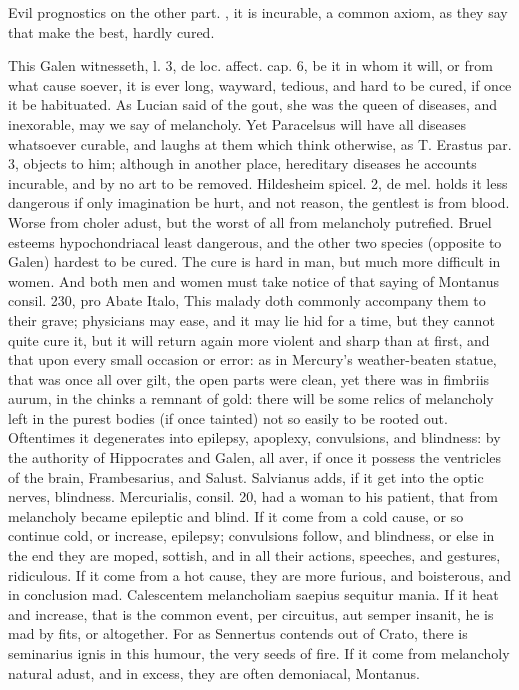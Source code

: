 Evil prognostics on the other part. , it is incurable, a common axiom,  as they say that make the best, hardly cured.

This Galen witnesseth, l. 3, de loc. affect. cap. 6, be it in
whom it will, or from what cause soever, it is ever long, wayward,
tedious, and hard to be cured, if once it be habituated. As Lucian said
of the gout, she was the queen of diseases, and inexorable, may
we say of melancholy. Yet Paracelsus will have all diseases whatsoever
curable, and laughs at them which think otherwise, as T. Erastus par.
3, objects to him; although in another place, hereditary diseases he
accounts incurable, and by no art to be removed. Hildesheim
spicel. 2, de mel. holds it less dangerous if only imagination be
hurt, and not reason, the gentlest is from blood. Worse from
choler adust, but the worst of all from melancholy putrefied.
Bruel esteems hypochondriacal least dangerous, and the other two
species (opposite to Galen) hardest to be cured. The cure is hard
in man, but much more difficult in women. And both men and women must
take notice of that saying of Montanus consil. 230, pro Abate Italo,
This malady doth commonly accompany them to their grave;
physicians may ease, and it may lie hid for a time, but they cannot
quite cure it, but it will return again more violent and sharp than at
first, and that upon every small occasion or error: as in Mercury's
weather-beaten statue, that was once all over gilt, the open parts were
clean, yet there was in fimbriis aurum, in the chinks a remnant of
gold: there will be some relics of melancholy left in the purest bodies
(if once tainted) not so easily to be rooted out.  Oftentimes it
degenerates into epilepsy, apoplexy, convulsions, and blindness: by the
authority of Hippocrates and Galen, all aver, if once it possess
the ventricles of the brain, Frambesarius, and Salust. Salvianus adds,
if it get into the optic nerves, blindness. Mercurialis, consil. 20,
had a woman to his patient, that from melancholy became epileptic and
blind. If it come from a cold cause, or so continue cold, or
increase, epilepsy; convulsions follow, and blindness, or else in the
end they are moped, sottish, and in all their actions, speeches, and
gestures, ridiculous. If it come from a hot cause, they are more
furious, and boisterous, and in conclusion mad. Calescentem
melancholiam saepius sequitur mania. If it heat and increase,
that is the common event, per circuitus, aut semper insanit, he
is mad by fits, or altogether. For as Sennertus contends out of
Crato, there is seminarius ignis in this humour, the very seeds of
fire. If it come from melancholy natural adust, and in excess, they are
often demoniacal, Montanus.

